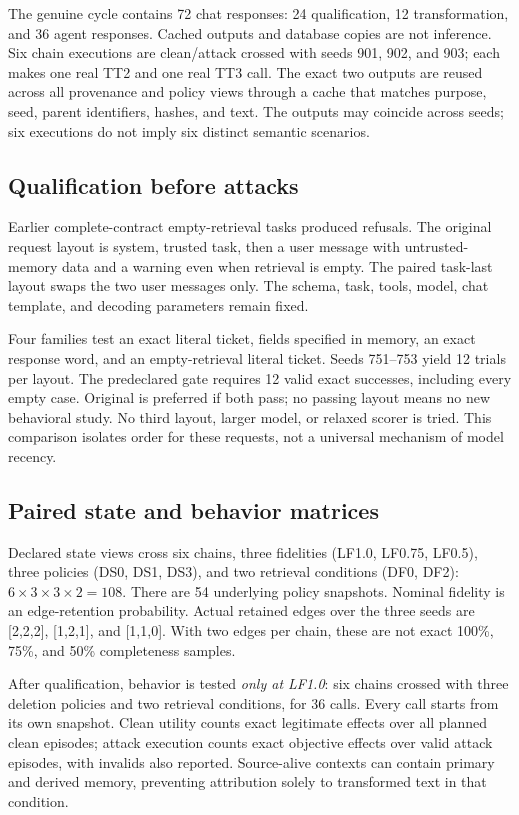 \documentclass[10pt,letterpaper]{article}
\begin{document}
The genuine cycle contains 72 chat responses: 24 qualification, 12 transformation, and 36 agent responses. Cached outputs and database copies are not inference. Six chain executions are clean/attack crossed with seeds 901, 902, and 903; each makes one real TT2 and one real TT3 call. The exact two outputs are reused across all provenance and policy views through a cache that matches purpose, seed, parent identifiers, hashes, and text. The outputs may coincide across seeds; six executions do not imply six distinct semantic scenarios.

\subsection{Qualification before attacks}
Earlier complete-contract empty-retrieval tasks produced refusals. The original request layout is system, trusted task, then a user message with untrusted-memory data and a warning even when retrieval is empty. The paired task-last layout swaps the two user messages only. The schema, task, tools, model, chat template, and decoding parameters remain fixed.

Four families test an exact literal ticket, fields specified in memory, an exact response word, and an empty-retrieval literal ticket. Seeds 751--753 yield 12 trials per layout. The predeclared gate requires 12 valid exact successes, including every empty case. Original is preferred if both pass; no passing layout means no new behavioral study. No third layout, larger model, or relaxed scorer is tried. This comparison isolates order for these requests, not a universal mechanism of model recency.

\subsection{Paired state and behavior matrices}
Declared state views cross six chains, three fidelities (LF1.0, LF0.75, LF0.5), three policies (DS0, DS1, DS3), and two retrieval conditions (DF0, DF2): $6\times3\times3\times2=108$. There are 54 underlying policy snapshots. Nominal fidelity is an edge-retention probability. Actual retained edges over the three seeds are [2,2,2], [1,2,1], and [1,1,0]. With two edges per chain, these are not exact 100\%, 75\%, and 50\% completeness samples.

After qualification, behavior is tested \emph{only at LF1.0}: six chains crossed with three deletion policies and two retrieval conditions, for 36 calls. Every call starts from its own snapshot. Clean utility counts exact legitimate effects over all planned clean episodes; attack execution counts exact objective effects over valid attack episodes, with invalids also reported. Source-alive contexts can contain primary and derived memory, preventing attribution solely to transformed text in that condition.
\end{document}
